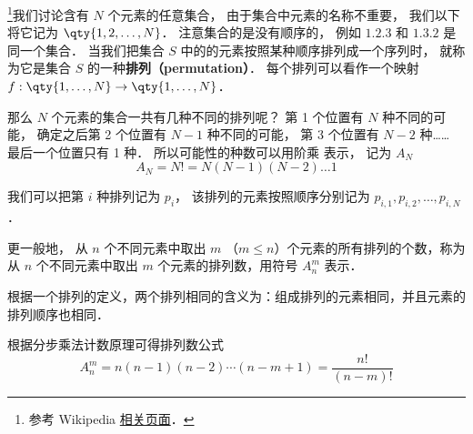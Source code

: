


\footnote{参考 Wikipedia \href{https://en.wikipedia.org/wiki/Permutation}{相关页面}．}我们讨论含有 $N$ 个元素的任意集合， 由于集合中元素的名称不重要， 我们以下将它记为 $\qty{1,2,\dots, N}$． 注意集合的是没有顺序的， 例如 $\qty{1,2,3}$ 和 $\qty{1,3,2}$ 是同一个集合． 当我们把集合 $S$ 中的的元素按照某种顺序排列成一个序列时， 就称为它是集合 $S$ 的一种\textbf{排列（permutation）}． 每个排列可以看作一个映射 $f:\qty{1,\dots,N}\to\qty{1,\dots,N}$．

那么 $N$ 个元素的集合一共有几种不同的排列呢？ 第 1 个位置有 $N$ 种不同的可能， 确定之后第 2 个位置有 $N-1$ 种不同的可能， 第 3 个位置有 $N-2$ 种…… 最后一个位置只有 1 种． 所以可能性的种数可以用阶乘 表示， 记为 $A_N$
\begin{equation}
A_N = N! = N(N-1)(N-2)\dots 1
\end{equation}

我们可以把第 $i$ 种排列记为 $p_i$， 该排列的元素按照顺序分别记为 $p_{i,1}, p_{i,2}, \dots, p_{i,N}$．

更一般地， 从 $n$ 个不同元素中取出 $m$ （$m \leq n$）个元素的所有排列的个数，称为从 $n$ 个不同元素中取出 $m$ 个元素的排列数，用符号 $A_n^m$ 表示．

根据一个排列的定义，两个排列相同的含义为：组成排列的元素相同，并且元素的排列顺序也相同．

根据分步乘法计数原理可得排列数公式
\begin{equation}\label{permut_eq1}
A_n^m = n (n - 1)(n - 2) \cdots (n - m + 1) =\frac{n!}{(n - m)!}
\end{equation}

